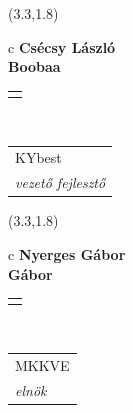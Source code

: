 \documentclass[11pt]{article}
\begin{document}
\makebox(3.3,1.8){
  \renewcommand\arraystretch{1.3}
  \begin{tabular}[c]{c}
    \hspace{8.5mm}
    \LARGE\bf{ Csécsy László }\\
    \hspace{8.5mm}
    \Large{ Boobaa }\\
    \renewcommand\arraystretch{3}
    \begin{tabular}[c]{c}
      \centering
      \fontfamily{phv}\selectfont{
        \textbf{
          \textsc{
            \scriptsize{
            \color{Bright}{ Ismerkedő }\color{Dark}{ Webmester }\color{Dark}{ Sminkmester }\color{Dark}{ Programozó }
            }
          }
        }
      }
    \end{tabular}
    \\
    \renewcommand\arraystretch{1}
    \begin{tabular}{p{3.3in}}
      \hspace{.7cm}KYbest\\
      \hspace{.7cm}\emph{ vezető fejlesztő }\\
    \end{tabular}
  \end{tabular}
}

\makebox(3.3,1.8){
  \renewcommand\arraystretch{1.3}
  \begin{tabular}[c]{c}
    \hspace{8.5mm}
    \LARGE\bf{ Nyerges Gábor }\\
    \hspace{8.5mm}
    \Large{ Gábor }\\
    \renewcommand\arraystretch{3}
    \begin{tabular}[c]{c}
      \centering
      \fontfamily{phv}\selectfont{
        \textbf{
          \textsc{
            \scriptsize{
            \color{Dark}{ Ismerkedő }\color{Bright}{ Webmester }\color{Bright}{ Sminkmester }\color{Bright}{ Programozó }
            }
          }
        }
      }
    \end{tabular}
    \\
    \renewcommand\arraystretch{1}
    \begin{tabular}{p{3.3in}}
      \hspace{.7cm}MKKVE\\
      \hspace{.7cm}\emph{ elnök }\\
    \end{tabular}
  \end{tabular}
}
\end{document}
